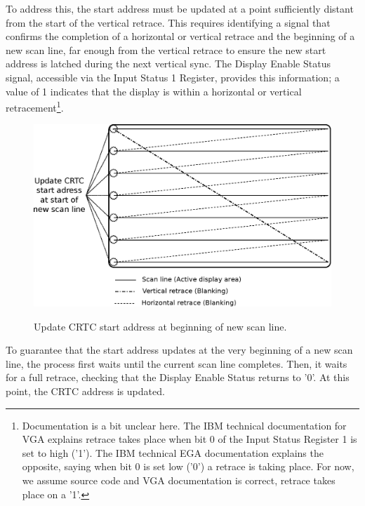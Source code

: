 \documentclass[book.tex]{subfiles}
\begin{document}
\pagebreak
To address this, the start address must be updated at a point sufficiently distant from the start of the vertical retrace. This requires identifying a signal that confirms the completion of a horizontal or vertical retrace and the beginning of a new scan line, far enough from the vertical retrace to ensure the new start address is latched during the next vertical sync. The Display Enable Status signal, accessible via the Input Status 1 Register, provides this information; a value of 1 indicates that the display is within a horizontal or vertical retracement\footnote{Documentation is a bit unclear here. The IBM technical documentation for VGA explains retrace takes place when bit 0 of the Input Status Register 1 is set to high ('1'). The IBM technical EGA documentation explains the opposite, saying when bit 0 is set low ('0') a retrace is taking place. For now, we assume source code and VGA documentation is correct, retrace takes place on a '1'.}.\\

 
\begin{figure}[H]
  \centering
  \includegraphics[width=\textwidth]{imgs/drawings/update_start_address.eps}
  \label{fig:update_start_address}
  \caption{Update CRTC start address at beginning of new scan line.}
\end{figure}

\par
To guarantee that the start address updates at the very beginning of a new scan line, the process first waits until the current scan line completes. Then, it waits for a full retrace, checking that the Display Enable Status returns to '0'. At this point, the CRTC address is updated.\\

\end{document}

